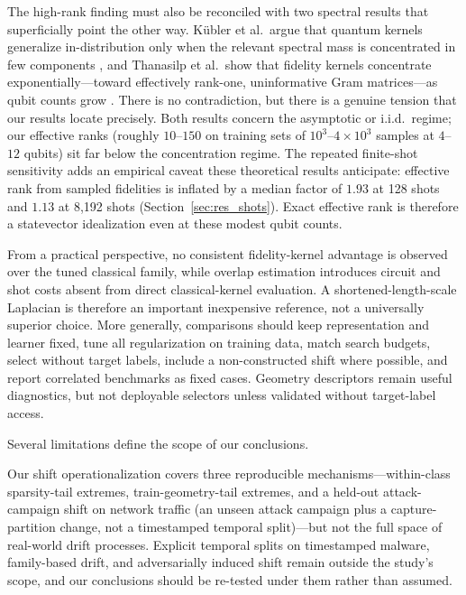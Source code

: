 \documentclass[referee,lineno,pdflatex,sn-nature]{sn-jnl}
\theoremstyle{thmstyleone}%
\theoremstyle{thmstyletwo}%
\theoremstyle{thmstylethree}%
\begin{document}
The high-rank finding must also be reconciled with two spectral results that superficially point the other way. K\"ubler et al.\ argue that quantum kernels generalize in-distribution only when the relevant spectral mass is concentrated in few components \cite{kubler2021inductivebias}, and Thanasilp et al.\ show that fidelity kernels concentrate exponentially---toward effectively rank-one, uninformative Gram matrices---as qubit counts grow \cite{thanasilp2024concentration}. There is no contradiction, but there is a genuine tension that our results locate precisely. Both results concern the asymptotic or i.i.d.\ regime; our effective ranks (roughly $10$--$150$ on training sets of $10^3$--$4\times10^3$ samples at $4$--$12$ qubits) sit far below the concentration regime. The repeated finite-shot sensitivity adds an empirical caveat these theoretical results anticipate: effective rank from sampled fidelities is inflated by a median factor of $1.93$ at 128 shots and $1.13$ at 8,192 shots (Section~\ref{sec:res_shots}). Exact effective rank is therefore a statevector idealization even at these modest qubit counts.

From a practical perspective, no consistent fidelity-kernel advantage is observed over the tuned classical family, while overlap estimation introduces circuit and shot costs absent from direct classical-kernel evaluation. A shortened-length-scale Laplacian is therefore an important inexpensive reference, not a universally superior choice. More generally, comparisons should keep representation and learner fixed, tune all regularization on training data, match search budgets, select without target labels, include a non-constructed shift where possible, and report correlated benchmarks as fixed cases. Geometry descriptors remain useful diagnostics, but not deployable selectors unless validated without target-label access.

Several limitations define the scope of our conclusions.

Our shift operationalization covers three reproducible mechanisms---within-class sparsity-tail extremes, train-geometry-tail extremes, and a held-out attack-campaign shift on network traffic (an unseen attack campaign plus a capture-partition change, not a timestamped temporal split)---but not the full space of real-world drift processes. Explicit temporal splits on timestamped malware, family-based drift, and adversarially induced shift remain outside the study's scope, and our conclusions should be re-tested under them rather than assumed.
\end{document}
